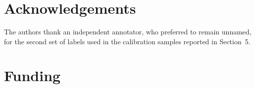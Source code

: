 \documentclass[a4paper,fleqn]{cas-sc}
\begin{document}
\section*{Acknowledgements}
The authors thank an independent annotator, who preferred to remain unnamed, for
the second set of labels used in the calibration samples reported in
Section~5.

\section*{Funding}
\end{document}
